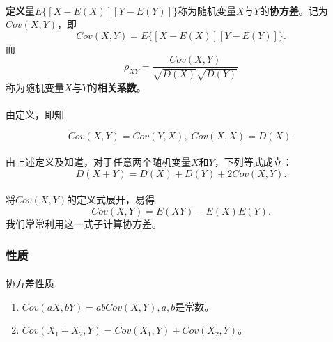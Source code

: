 \paragraph{}
\textbf{定义\;}量$E\{[X - E(X)][Y - E(Y)]\}$称为随机变量$X$与$Y$的\textbf{协方差}。记为$Cov(X,Y)$，即
\begin{equation}
  Cov(X,Y) = E\{[X - E(X)][Y - E(Y)]\}.
\end{equation}
而
\begin{equation}
  \rho_{XY} = \frac{Cov(X,Y)}{\sqrt{D(X)}\sqrt{D(Y)}}
\end{equation}
称为随机变量$X$与$Y$的\textbf{相关系数}。

\paragraph{}
由定义，即知

\begin{equation}
  Cov(X,Y)=Cov(Y,X), \; Cov(X,X) = D(X).
\end{equation}

\paragraph{}
由上述定义及知道，对于任意两个随机变量$X$和$Y$，下列等式成立：
\begin{equation}
  D(X+Y) = D(X) + D(Y) + 2Cov(X,Y).
\end{equation}

\paragraph{}
将$Cov(X,Y)$的定义式展开，易得
\begin{equation}
  Cov(X,Y) = E(XY) - E(X)E(Y).
\end{equation}
我们常常利用这一式子计算协方差。

\subsubsection{性质}
\paragraph{}
协方差性质
\begin{enumerate}
  \item $Cov(aX,bY)=abCov(X,Y), a, b$是常数。
  \item $Cov(X_1 + X_2,Y)=Cov(X_1,Y)+Cov(X_2,Y)$。
\end{enumerate}

